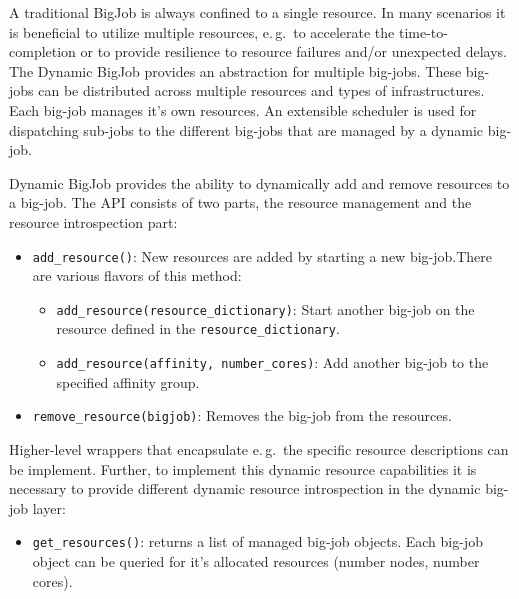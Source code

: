 \documentclass[conference,final]{IEEEtran}
\begin{document}
\label{sec:dynamic_bigjob}
A traditional BigJob is always confined to a single resource. In many scenarios 
it is beneficial to utilize multiple resources, e.\,g.\ to accelerate the
time-to-completion or to provide resilience to resource failures and/or
unexpected delays. The Dynamic BigJob provides an abstraction for multiple
big-jobs. These big-jobs can be distributed across multiple resources and types
of infrastructures. Each big-job manages it's own resources. An extensible
scheduler is used for dispatching sub-jobs to the different big-jobs that are
managed by a dynamic big-job.


Dynamic BigJob provides the ability to dynamically add and remove resources to a 
big-job. The API consists of two parts, the resource management and the resource 
introspection part:
\begin{itemize}
    \item \texttt{add\_resource()}: New resources are added by starting a new
    big-job.There are various flavors of this method:
    \begin{itemize}
        \item \texttt{add\_resource(re\-sour\-ce\_dic\-tionary)}: Start another big-job on the resource defined in the \texttt{resource\_dictionary}.
        \item \texttt{add\_resource(affinity, number\_cores)}: Add another big-job to the specified affinity group.
    \end{itemize}
    \item \texttt{remove\_resource(bigjob)}: Removes the big-job from the
    resources.
\end{itemize}

Higher-level wrappers that encapsulate e.\,g.\ the specific resource
descriptions can be implement. Further, to implement this dynamic resource
capabilities it is necessary to provide different dynamic resource introspection
in the dynamic big-job layer:
\begin{itemize}
    \item \texttt{get\_resources()}: returns a list of managed big-job objects.
     Each big-job object can be queried for it's allocated resources (number 
     nodes, number cores).
\end{itemize}


\end{document}
